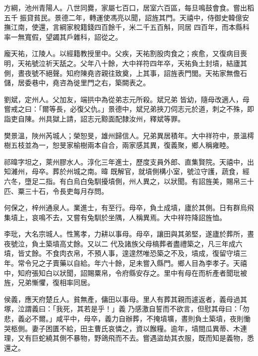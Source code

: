 \begin{pinyinscope}
 方綱，池州青陽人。八世同爨，家屬七百口，居室六百區，每旦鳴鼓會食。嘗出稻五千𥮬振貸貧民。景德二年，轉運使馮亮以聞，詔旌其門。天禧中，侍御史韓億安撫江南，使還，言綱家稅籍錢四百餘千，米二千五百斛，同居
 四百年，而本縣科率一無寬假，望蠲其戶雜科，詔從之。



 龐天祐，江陵人。以經籍教授里中。父疾，天祐割股肉食之；疾愈，又復病目喪明，天祐號泣祈天舐之。父年八十餘，大中祥符四年卒，天祐負土封墳，結廬其側，晝夜號不絕聲。知府陳堯咨親往致奠，上其事，詔旌表門閭。天祐家無儋石儲，居委巷中，堯咨為徙里門之右，築闕表之。



 劉斌，定州人。父加友，端拱中為從弟志元所殺。斌兄弟
 皆幼，隨母改適人，母嘗戒之曰：「爾等長，必復父仇。」景德中，斌兄弟挾刀伺志元於道，刺之不殊，即詣吏自陳。州具獄上請，詔志元黥面配隸汝州，釋斌等罪。



 樊景溫，陜州芮城人；榮恕旻，雄州歸信人。兄弟異居積年。大中祥符中，景溫樗樹五枝並為一，恕旻家榆樹兩本自合，兩家感其異，復義聚，鄉人稱雍睦。



 祁暐字坦之，萊州膠水人。淳化三年進士，歷度支員外郎、直集賢院。天禧中，出知濰州，母卒。葬於州城之南。暐
 既解官，就墳側構小室，號泣守護，蔬食，經六冬，墮足二指。有白烏白兔馴擾墳側，州人異之，以狀聞。有詔旌美，賜帛三十匹、粟三十石，令長吏每月存問。



 何保之，梓州通泉人。業進士，有至行。母卒，負土成墳，廬於其側。日有群烏飛集墳上，哀鳴不去，又嘗有兔馴於坐隅，人稱異焉。大中祥符降詔旌恤。



 李玭，大名宗城人。性篤孝，力耕以事母。母卒，讓田與其弟堅，遂廬於葬所，晝夜號泣，負土築墳高丈餘。又以二
 代及諸族父母槁葬者盡禮築之，凡三年成六墳，皆丈餘。不食肉衣帛，不預人事，遑遑然唯恐築之不及，墳成，復留守墳三年。常令兄之子賣藥以自給。年六十餘，足未嘗入縣門。鄉人目為李孝子。天禧中，知府張知白以狀聞，詔賜粟帛，令府縣安存之。里中有母在而析產者聞玭被旌，兄弟慚懼，復相率同居。



 侯義，應天府楚丘人。貧無產，傭田以事母。里人有葬其親而遽返者，義母過其塚，泣謂義曰：「我死，其若是乎！」義
 乃感激自誓而不欲言，但慰其母曰：「勿悲，義必不爾。」咸平中，母卒，義力自辦葬，不掩墳壙，晝則負土築墳，夜則慟哭柩側。妻子困匱不給，田主曹氏哀憐之，資以餱糧。逾年，墳間瓜異蒂、木連理，又有巨蛇繞其側不暴物，野鴿飛而不去。嘗遇盜劫其衣服，既而知是義物，悉還之。




\end{pinyinscope}
